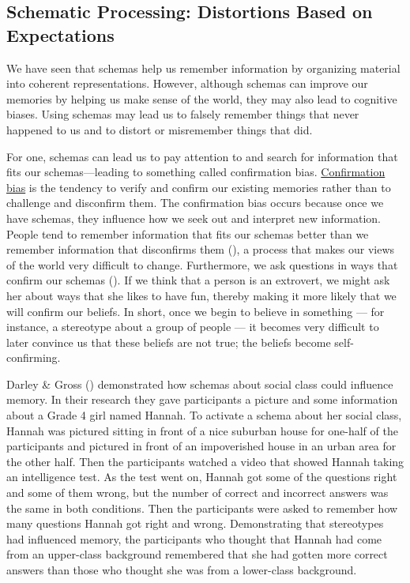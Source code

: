 \documentclass[
]{krantz}
\begin{document}
\subsection*{Schematic Processing: Distortions Based on Expectations}\label{schematic-processing-distortions-based-on-expectations}


We have seen that schemas help us remember information by organizing material into coherent representations. However, although schemas can improve our memories by helping us make sense of the world, they may also lead to cognitive biases. Using schemas may lead us to falsely remember things that never happened to us and to distort or misremember things that did.

For one, schemas can lead us to pay attention to and search for information that fits our schemas---leading to something called confirmation bias. \hyperref[confirmation-bias]{Confirmation bias} is the tendency to verify and confirm our existing memories rather than to challenge and disconfirm them. The confirmation bias occurs because once we have schemas, they influence how we seek out and interpret new information. People tend to remember information that fits our schemas better than we remember information that disconfirms them (), a process that makes our views of the world very difficult to change. Furthermore, we ask questions in ways that confirm our schemas (). If we think that a person is an extrovert, we might ask her about ways that she likes to have fun, thereby making it more likely that we will confirm our beliefs. In short, once we begin to believe in something --- for instance, a stereotype about a group of people --- it becomes very difficult to later convince us that these beliefs are not true; the beliefs become self-confirming.

Darley \& Gross () demonstrated how schemas about social class could influence memory. In their research they gave participants a picture and some information about a Grade 4 girl named Hannah. To activate a schema about her social class, Hannah was pictured sitting in front of a nice suburban house for one-half of the participants and pictured in front of an impoverished house in an urban area for the other half. Then the participants watched a video that showed Hannah taking an intelligence test. As the test went on, Hannah got some of the questions right and some of them wrong, but the number of correct and incorrect answers was the same in both conditions. Then the participants were asked to remember how many questions Hannah got right and wrong. Demonstrating that stereotypes had influenced memory, the participants who thought that Hannah had come from an upper-class background remembered that she had gotten more correct answers than those who thought she was from a lower-class background.
\end{document}
